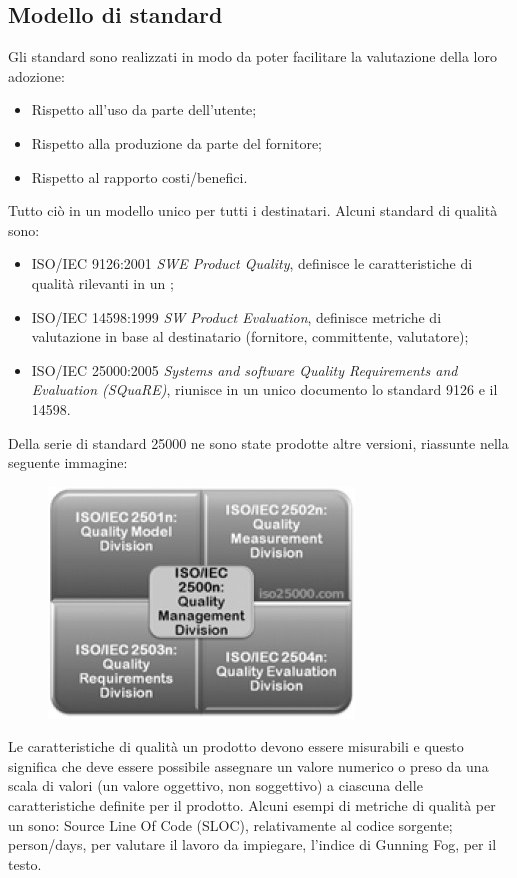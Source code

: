 \documentclass[../main]{subfiles}
\begin{document}
\subsection{Modello di standard}
Gli standard sono realizzati in modo da poter facilitare la valutazione della loro adozione:
\begin{itemize}
    \item Rispetto all'uso da parte dell'utente;
    \item Rispetto alla produzione da parte del fornitore;
    \item Rispetto al rapporto costi/benefici.
\end{itemize}
Tutto ciò in un modello unico per tutti i destinatari.
Alcuni standard di qualità sono:
\begin{itemize}
    \item ISO/IEC 9126:2001 \textit{SWE Product Quality}, definisce le caratteristiche di qualità rilevanti in un ;
    \item ISO/IEC 14598:1999 \textit{SW Product Evaluation}, definisce metriche di valutazione in base al destinatario (fornitore, committente, valutatore);
    \item ISO/IEC 25000:2005 \textit{Systems and software Quality Requirements and Evaluation (SQuaRE)}, riunisce in un unico documento lo standard 9126 e il 14598.
\end{itemize}
Della serie di standard 25000 ne sono state prodotte altre versioni, riassunte nella seguente immagine:
\begin{figure}[h]
    \begin{center}
        \includegraphics[scale=0.8]{immagini/iso25000.jpg}
    \end{center}
\end{figure}
Le caratteristiche di qualità un prodotto devono essere misurabili e questo significa che deve essere possibile assegnare un valore numerico o preso da una scala di valori (un valore oggettivo, non soggettivo) a ciascuna delle caratteristiche definite per il prodotto.
Alcuni esempi di metriche di qualità per un  sono: Source Line Of Code (SLOC), relativamente al codice sorgente; person/days, per valutare il lavoro da impiegare, l'indice di Gunning Fog, per il testo.
\end{document}
